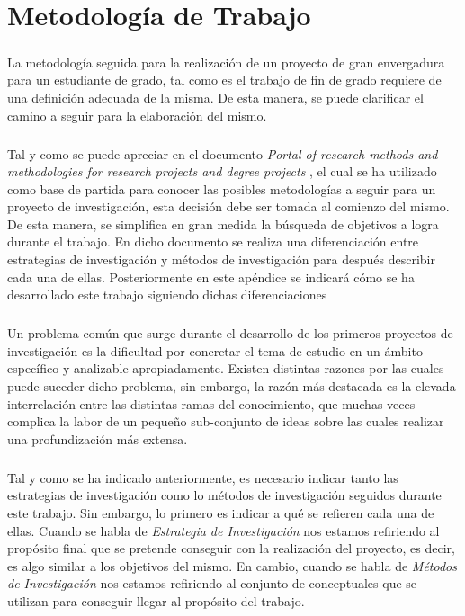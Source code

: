 \documentclass{subfiles}
\begin{document}
  \chapter{Metodología de Trabajo}
  \label{chap:methodology}

    \paragraph{}
    La metodología seguida para la realización de un proyecto de gran envergadura para un estudiante de grado, tal como es el trabajo de fin de grado requiere de una definición adecuada de la misma. De esta manera, se puede clarificar el camino a seguir para la elaboración del mismo.

    \paragraph{}
    Tal y como se puede apreciar en el documento \emph{Portal of research methods and methodologies for research projects and degree projects} \cite{haakansson2013portal}, el cual se ha utilizado como base de partida para conocer las posibles metodologías a seguir para un proyecto de investigación, esta decisión debe ser tomada al comienzo del mismo. De esta manera, se simplifica en gran medida la búsqueda de objetivos a logra durante el trabajo. En dicho documento \cite{haakansson2013portal} se realiza una diferenciación entre estrategias de investigación y métodos de investigación para después describir cada una de ellas. Posteriormente en este apéndice se indicará cómo se ha desarrollado este trabajo siguiendo dichas diferenciaciones

    \paragraph{}
    Un problema común que surge durante el desarrollo de los primeros proyectos de investigación es la dificultad por concretar el tema de estudio en un ámbito específico y analizable apropiadamente. Existen distintas razones por las cuales puede suceder dicho problema, sin embargo, la razón más destacada es la elevada interrelación entre las distintas ramas del conocimiento, que muchas veces complica la labor de  un pequeño sub-conjunto de ideas sobre las cuales realizar una profundización más extensa.

    \paragraph{}
    Tal y como se ha indicado anteriormente, es necesario indicar tanto las estrategias de investigación como lo métodos de investigación seguidos durante este trabajo. Sin embargo, lo primero es indicar a qué se refieren cada una de ellas. Cuando se habla de \emph{Estrategia de Investigación} nos estamos refiriendo al propósito final que se pretende conseguir con la realización del proyecto, es decir, es algo similar a los objetivos del mismo. En cambio, cuando se habla de \emph{Métodos de Investigación} nos estamos refiriendo al conjunto de  conceptuales que se utilizan para conseguir llegar al propósito del trabajo.
\end{document}
